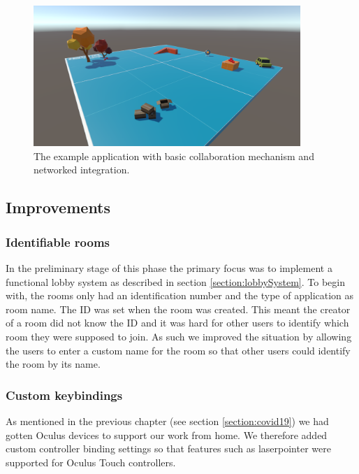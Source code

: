\begin{figure}[H]
  \centering
   \captionsetup{width=.9\linewidth}
    \includegraphics[width=0.9\textwidth]{fig/phase_3/implementation/demoApp.PNG}
 \caption{The example application with basic collaboration mechanism and networked integration.}
\label{fig:phase3_demoApp}
\end{figure}






\subsection{Improvements}


\subsubsection{Identifiable rooms}
In the preliminary stage of this phase the primary focus was to implement a functional lobby system as described in section \ref{section:lobbySystem}. To begin with, the rooms only had an identification number and the type of application as room name. The ID was set when the room was created. This meant the creator of a room did not know the ID and it was hard for other users to identify which room they were supposed to join. As such we improved the situation by allowing the users to enter a custom name for the room so that other users could identify the room by its name.   


\subsubsection{Custom keybindings}
As mentioned in the previous chapter (see section \ref{section:covid19}) we had gotten Oculus devices to support our work from home. We therefore added custom controller binding settings so that features such as laserpointer were supported for Oculus Touch controllers.   



